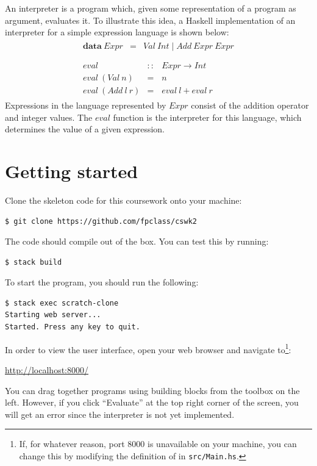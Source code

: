 An interpreter is a program which, given some representation of a program as argument, evaluates it. To illustrate this idea, a Haskell implementation of an interpreter for a simple expression language is shown below:
\begin{displaymath}
\begin{array}{l}
\begin{array}{lcl}
\mathbf{data}~\mathit{Expr} & = & \mathit{Val}~\mathit{Int} \mid \mathit{Add}~\mathit{Expr}~\mathit{Expr}
\end{array} \\\\
\begin{array}{lcl}
\mathit{eval} & :: & \mathit{Expr} \to \mathit{Int} \\
\mathit{eval}~(\mathit{Val}~n) & = & n\\
\mathit{eval}~(\mathit{Add}~l~r) & = & \mathit{eval}~l + \mathit{eval}~r
\end{array}
\end{array}
\end{displaymath}
Expressions in the language represented by $\mathit{Expr}$ consist of the addition operator and integer values. The $\mathit{eval}$ function is the interpreter for this language, which determines the value of a given expression.

\section{Getting started}

Clone the skeleton code for this coursework onto your machine:
\begin{verbatim}
$ git clone https://github.com/fpclass/cswk2
\end{verbatim}
The code should compile out of the box. You can test this by running:
\begin{verbatim}
$ stack build
\end{verbatim}
To start the program, you should run the following:
\begin{verbatim}
$ stack exec scratch-clone
Starting web server...
Started. Press any key to quit.
\end{verbatim}
In order to view the user interface, open your web browser and navigate to\footnote{If, for whatever reason, port 8000 is unavailable on your machine, you can change this by modifying the definition of  in \texttt{\small src/Main.hs}.}:
\begin{center}
\url{http://localhost:8000/}
\end{center}
You can drag together programs using building blocks from the toolbox on the left. However, if you click ``Evaluate'' at the top right corner of the screen, you will get an error since the interpreter is not yet implemented.

